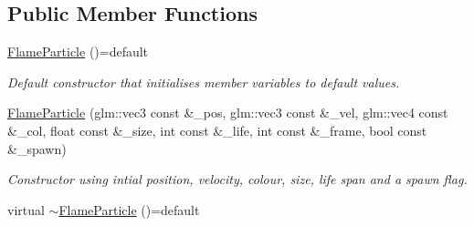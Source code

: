 \subsection*{Public Member Functions}
\begin{DoxyCompactItemize}
\item 
\hypertarget{classFlameParticle_af0faccc4ff4f1ff25aa1489cb98fee41}{\hyperlink{classFlameParticle_af0faccc4ff4f1ff25aa1489cb98fee41}{Flame\-Particle} ()=default}\label{classFlameParticle_af0faccc4ff4f1ff25aa1489cb98fee41}

\begin{DoxyCompactList}\small\item\em Default constructor that initialises member variables to default values. \end{DoxyCompactList}\item 
\hyperlink{classFlameParticle_aacb39d3f0127656555c0f5bdbf12dfea}{Flame\-Particle} (glm\-::vec3 const \&\-\_\-pos, glm\-::vec3 const \&\-\_\-vel, glm\-::vec4 const \&\-\_\-col, float const \&\-\_\-size, int const \&\-\_\-life, int const \&\-\_\-frame, bool const \&\-\_\-spawn)
\begin{DoxyCompactList}\small\item\em Constructor using intial position, velocity, colour, size, life span and a spawn flag. \end{DoxyCompactList}\item 
\hypertarget{classFlameParticle_a22bf84e45b0da08457b869be7671eb5b}{virtual \hyperlink{classFlameParticle_a22bf84e45b0da08457b869be7671eb5b}{$\sim$\-Flame\-Particle} ()=default}\label{classFlameParticle_a22bf84e45b0da08457b869be7671eb5b}


\end{DoxyCompactItemize}
